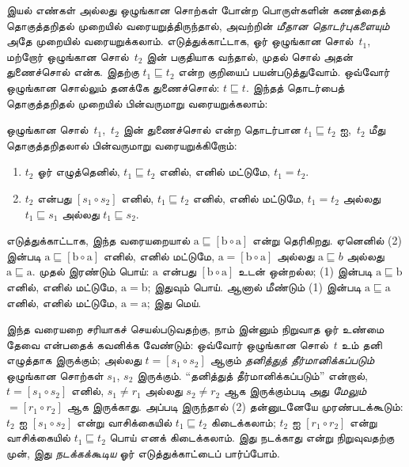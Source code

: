 \documentclass[../../../include/open-logic-section]{subfiles}
\begin{document}


இயல் எண்கள் அல்லது ஒழுங்கான சொற்கள் போன்ற
பொருள்களின் கணத்தைத் தொகுத்தறிதல் முறையில்
வரையறுத்திருந்தால், அவற்றின் \emph{மீதான தொடர்புகளையும்}
அதே முறையில் வரையறுக்கலாம். எடுத்துக்காட்டாக,
ஓர் ஒழுங்கான சொல்~$t_1$, மற்றோர் ஒழுங்கான
சொல்~$t_2$ இன் பகுதியாக வந்தால், முதல்
சொல் அதன் துணைச்சொல் என்க. இதற்கு
$t_1 \sqsubseteq t_2$ என்ற குறியைப்
பயன்படுத்துவோம். ஒவ்வோர் ஒழுங்கான சொல்லும்
தனக்கே துணைச்சொல்: $t \sqsubseteq t$.
இந்தத் தொடர்பைத் தொகுத்தறிதல் முறையில்
பின்வருமாறு வரையறுக்கலாம்:

\begin{defn}
  ஒழுங்கான சொல்~$t_1$,~$t_2$ இன்
  துணைச்சொல் என்ற தொடர்பான $t_1
  \sqsubseteq t_2$ ஐ,~$t_2$ மீது
  தொகுத்தறிதலால் பின்வருமாறு வரையறுக்கிறோம்:
  \begin{enumerate}
  \item $t_2$ ஓர் எழுத்தெனில்,
    $t_1 \sqsubseteq t_2$ எனில், எனில்
    மட்டுமே, $t_1 = t_2$.
  \item $t_2$ என்பது $[s_1 \circ s_2]$
    எனில், $t_1 \sqsubseteq t_2$ எனில்,
    எனில் மட்டுமே, $t_1 = t_2$ அல்லது
    $t_1 \sqsubseteq s_1$ அல்லது
    $t_1 \sqsubseteq s_2$.
  \end{enumerate}
\end{defn}

எடுத்துக்காட்டாக, இந்த வரையறையால்
$\mathrm{a} \sqsubseteq [\mathrm{b} \circ
\mathrm{a}]$ என்று தெரிகிறது. ஏனெனில்
(2) இன்படி $\mathrm{a} \sqsubseteq
[\mathrm{b} \circ \mathrm{a}]$ எனில்,
எனில் மட்டுமே, $\mathrm{a} = [\mathrm{b}
\circ \mathrm{a}]$ அல்லது
$\mathrm{a} \sqsubseteq b$ அல்லது
$\mathrm{a} \sqsubseteq \mathrm{a}$.
முதல் இரண்டும் பொய்: $\mathrm{a}$ என்பது
$[\mathrm{b} \circ \mathrm{a}]$ உடன்
ஒன்றல்ல; (1) இன்படி
$\mathrm{a} \sqsubseteq \mathrm{b}$
எனில், எனில் மட்டுமே,
$\mathrm{a} = \mathrm{b}$; இதுவும் பொய்.
ஆனால் மீண்டும் (1) இன்படி
$\mathrm{a} \sqsubseteq \mathrm{a}$
எனில், எனில் மட்டுமே,
$\mathrm{a} = \mathrm{a}$; இது மெய்.

இந்த வரையறை சரியாகச் செயல்படுவதற்கு,
நாம் இன்னும் நிறுவாத ஓர் உண்மை தேவை
என்பதைக் கவனிக்க வேண்டும்: ஒவ்வோர் ஒழுங்கான
சொல்~$t$ உம் தனி எழுத்தாக இருக்கும்;
அல்லது $t = [s_1 \circ s_2]$ ஆகும்
\emph{தனித்துத் தீர்மானிக்கப்படும்} ஒழுங்கான
சொற்கள் $s_1$, $s_2$ இருக்கும்.
``தனித்துத் தீர்மானிக்கப்படும்'' என்றால்,
$t = [s_1 \circ s_2]$ எனில்,
$s_1 \neq r_1$ அல்லது $s_2 \neq r_2$
ஆக இருக்கும்படி அது \emph{மேலும்}
$= [r_1 \circ r_2]$ ஆக இருக்காது.
அப்படி இருந்தால் (2) தன்னுடனேயே
முரண்படக்கூடும்: $t_2$ ஐ $[s_1 \circ s_2]$
என்று வாசிக்கையில் $t_1 \sqsubseteq t_2$
கிடைக்கலாம்; $t_2$ ஐ $[r_1 \circ r_2]$
என்று வாசிக்கையில் $t_1 \sqsubseteq t_2$
பொய் எனக் கிடைக்கலாம். இது நடக்காது
என்று நிறுவுவதற்கு முன், இது \emph{நடக்கக்கூடிய}
ஓர் எடுத்துக்காட்டைப் பார்ப்போம்.
\end{document}
